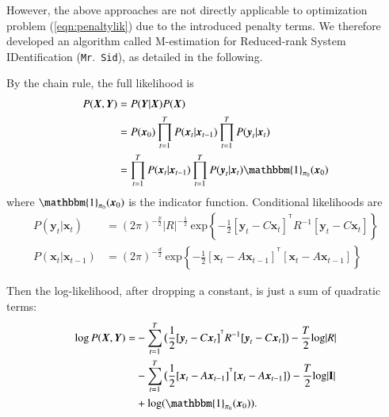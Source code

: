 \documentclass[times,twocolumn,final,authoryear]{elsarticle}
\newcommand{\mrsid}{{\sc \texttt{Mr}.~\texttt{Sid}}}
\providecommand{\mb}[1]{\boldsymbol{#1}}
\newcommand{\bx}{\mb{x}}
\newcommand{\by}{\mb{y}}
\newcommand{\bX}{\mb{X}}
\newcommand{\bY}{\mb{Y}}
\newcommand{\T}{^{\ensuremath{\mathsf{T}}}}           %
\let\oldref\ref
\renewcommand{\ref}[1]{(\oldref{#1})}
\begin{document}
However, the above approaches are not directly applicable to optimization problem \ref{eqn:penaltylik} due to the introduced penalty terms. We therefore developed an algorithm called M-estimation for Reduced-rank System IDentification (\mrsid), as detailed in the following.

By the chain rule, the full likelihood is
\begin{equation*}\label{eqn:likelihood}
\begin{aligned}
P(\bX,\bY)&=P(\bY|\bX) P(\bX)\\
&= P(\bx_0)\prod\limits_{t=1}^{T}P(\bx_t|\bx_{t-1})\prod\limits_{t=1}^{T} P(\by_t|\bx_t)\\&=\prod\limits_{t=1}^{T}P(\bx_t|\bx_{t-1})\prod\limits_{t=1}^{T} P(\by_t|\bx_t)\mathbbm{1}_{\mathbf{\pi}_0}(\bx_0)
\end{aligned}
\end{equation*}
where $\mathbbm{1}_{\mathbf{\pi}_0}(\bx_0)$ is the indicator function. Conditional likelihoods are
\begin{equation*}\label{eqn:condlik}
\begin{aligned}
P(\by_t|\bx_t)&= (2\pi)^{-\frac{p}{2}}|R|^{-\frac{1}{2}}\  \text{exp}\left\{-\frac{1}{2}[\by_t-C\bx_t]^{\T}R^{-1}[\by_t-C\bx_t]\right\}\\
P(\bx_t|\bx_{t-1})
&=(2\pi)^{-\frac{d}{2}}\  \text{exp}\left\{-\frac{1}{2}[\bx_t-A\bx_{t-1}]^{\T}[\bx_t-A\bx_{t-1}]\right\}
\end{aligned}
\end{equation*}

Then the log-likelihood, after dropping a constant, is just a sum of quadratic terms:
\begin{equation}\label{eqn:loglik}
\begin{split}
\log  P(\bX,\bY)=&-\sum\limits_{t=1}^{T}\big(\frac{1}{2}[\by_t-C\bx_t]^{\T}R^{-1}[\by_t-C\bx_t]\big)-\frac{T}{2}\text{log}|R|\\
&-\sum\limits_{t=1}^{T}\big(\frac{1}{2}[\bx_t-A\bx_{t-1}]^{\T}[\bx_t-A\bx_{t-1}]\big)-\frac{T}{2}\text{log}|\mathbf{I}|\\
&+ \text{log}(\mathbbm{1}_{\mathbf{\pi}_0}(\bx_0)).
\end{split}
\end{equation}
\end{document}
